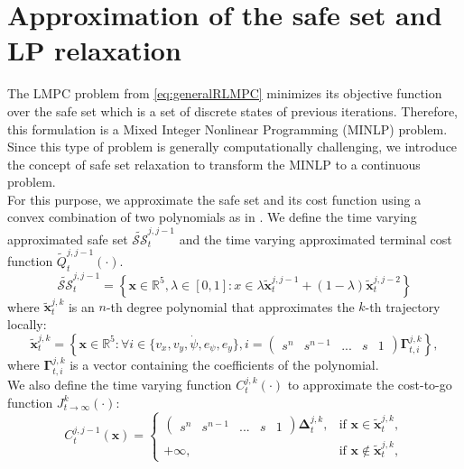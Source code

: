 \section{Approximation of the safe set and LP relaxation}
The LMPC problem from \ref{eq:generalRLMPC} minimizes its objective function over the safe set which is a set of discrete states of previous iterations. Therefore, this formulation is a Mixed Integer Nonlinear Programming (MINLP) problem. Since this type of problem is generally computationally challenging, we introduce the concept of safe set relaxation to transform the MINLP to a continuous problem.\\
For this purpose, we approximate the safe set and its cost function using a convex combination of two polynomials as in \cite{RosoliaRacing}. We define the time varying approximated safe set $\tilde{\mathcal{SS}}_t^{j,j-1}$ and the time varying approximated terminal cost function $\tilde{Q}_t^{j,j-1}(\cdot)$.
\begin{equation}
\tilde{\mathcal{SS}}_t^{j,j-1} = \left\{\bm{x}\in\mathbb{R}^5,\lambda\in[0,1]: x\in\lambda \tilde{\bm{x}}_t^{j,j-1}+(1-\lambda)\tilde{\bm{x}}_t^{j,j-2}\right\}
\end{equation}
where $\tilde{\bm{x}}_t^{j,k}$ is an $n$-th degree polynomial that approximates the $k$-th trajectory locally:
\begin{equation}
\tilde{\bm{x}}_t^{j,k}=\left\{\bm{x}\in\mathbb{R}^5:\forall i\in\{v_x,v_y,\dot\psi,e_\psi,e_y\},i=\begin{pmatrix}s^n &s^{n-1}&...&s& 1\end{pmatrix}\bm{\Gamma}_{t,i}^{j,k}\right\},
\end{equation}
where $\bm{\Gamma}_{t,i}^{j,k}$ is a vector containing the coefficients of the polynomial.\\
We also define the time varying function $C_t^{j,k}(\cdot)$ to approximate the cost-to-go function $J_{t\rightarrow\infty}^k(\cdot)$:
\begin{equation}
C_t^{j,j-1}(\bm{x})=\begin{cases}
\begin{pmatrix}
s^n & s^{n-1} &...&s&1
\end{pmatrix}
\bm{\Delta}_t^{j,k},&\text{if } \bm{x}\in\tilde{\bm{x}}_t^{j,k},\\
+\infty,&\text{if } \bm{x}\not\in\tilde{\bm{x}}_t^{j,k},
\end{cases}
\end{equation}

